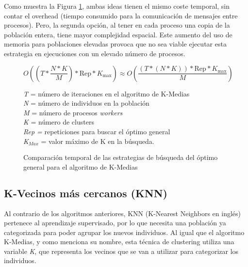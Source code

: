 		Como muestra la Figura \ref{fig:KMedias_comp}, ambas ideas tienen el mismo coste temporal, sin contar el overhead (tiempo consumido para la comunicación de mensajes entre procesos). Pero, la segunda opción, al tener en cada proceso una copia de la población entera, tiene mayor complejidad espacial. Este aumento del uso de memoria para poblaciones elevadas provoca que no sea viable ejecutar esta estrategia en ejecuciones con un elevado número de procesos.
		
		\begin{figure} [!h]
			\begin{mdframed}[roundcorner=5pt]
				\[
				O\left((T * \frac{N * K}{M}) * \text{Rep} * K_{\text{max}}\right) \approx O\left(\frac{{(T * (N * K)) * \text{Rep} * K_{\text{max}}}}{{M}}\right)
				\]
				
				
				
				\begin{tcolorbox}[boxrule=0.5pt, fontupper=\small]
					
					\textit{T} = número de iteraciones en el algoritmo de K-Medias\\
					\textit{N} = número de individuos en la población\\
					\textit{M} = número de procesos \textit{workers}\\
					\textit{K} = número de clusters\\
					\textit{Rep = }repeticiones para buscar el óptimo general\\
					\textit{K\(_{Max}\)} = valor máximo de K en la búsqueda.				
					
				\end{tcolorbox}
				
			\end{mdframed}
			\caption{Comparación temporal de las estrategias de búsqueda del óptimo general para el algoritmo de K-Medias}
			\label{fig:KMedias_comp}
		\end{figure}
		
		
		
		
	\subsection{K-Vecinos más cercanos (KNN)}
	\label{cap:3_2_3}
		Al contrario de los algoritmos anteriores, KNN (K-Nearest Neighbors en inglés) pertenece al aprendizaje supervisado, por lo que necesita una población ya categorizada para poder agrupar los nuevos individuos. Al igual que el algoritmo K-Medias, y como menciona su nombre, esta técnica de clustering utiliza una variable \textit{K}, que representa los vecinos que se van a utilizar para categorizar los individuos.
		
